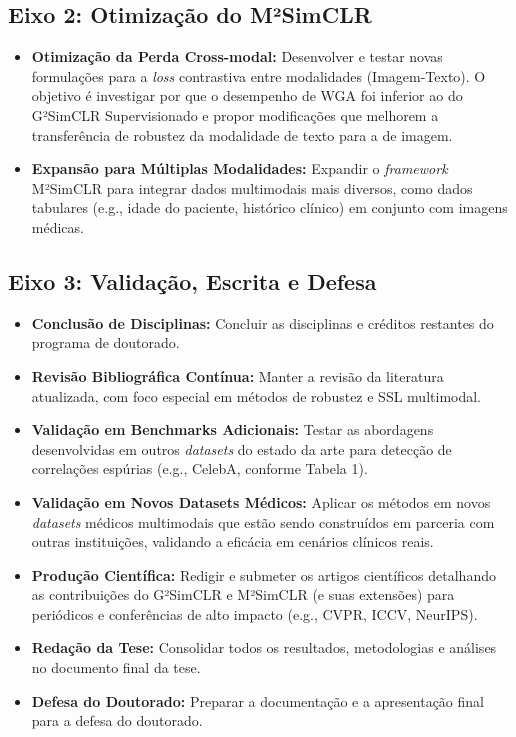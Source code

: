 \subsection{Eixo 2: Otimização do M²SimCLR}
\begin{itemize}
    \item \textbf{Otimização da Perda Cross-modal:} Desenvolver e testar novas formulações para a \textit{loss} contrastiva entre modalidades (Imagem-Texto). O objetivo é investigar por que o desempenho de WGA foi inferior ao do G²SimCLR Supervisionado e propor modificações que melhorem a transferência de robustez da modalidade de texto para a de imagem.
    \item \textbf{Expansão para Múltiplas Modalidades:} Expandir o \textit{framework} M²SimCLR para integrar dados multimodais mais diversos, como dados tabulares (e.g., idade do paciente, histórico clínico) em conjunto com imagens médicas.
\end{itemize}

\subsection{Eixo 3: Validação, Escrita e Defesa}
\begin{itemize}
    \item \textbf{Conclusão de Disciplinas:} Concluir as disciplinas e créditos restantes do programa de doutorado.
    \item \textbf{Revisão Bibliográfica Contínua:} Manter a revisão da literatura atualizada, com foco especial em métodos de robustez e SSL multimodal.
    \item \textbf{Validação em Benchmarks Adicionais:} Testar as abordagens desenvolvidas em outros \textit{datasets} do estado da arte para detecção de correlações espúrias (e.g., CelebA, conforme Tabela 1).
    \item \textbf{Validação em Novos Datasets Médicos:} Aplicar os métodos em novos \textit{datasets} médicos multimodais que estão sendo construídos em parceria com outras instituições, validando a eficácia em cenários clínicos reais.
    \item \textbf{Produção Científica:} Redigir e submeter os artigos científicos detalhando as contribuições do G²SimCLR e M²SimCLR (e suas extensões) para periódicos e conferências de alto impacto (e.g., CVPR, ICCV, NeurIPS).
    \item \textbf{Redação da Tese:} Consolidar todos os resultados, metodologias e análises no documento final da tese.
    \item \textbf{Defesa do Doutorado:} Preparar a documentação e a apresentação final para a defesa do doutorado.
\end{itemize}

